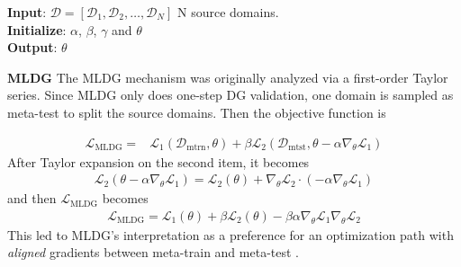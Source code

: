 \documentclass[runningheads]{llncs}
\newcommand{\nameS}{S-MLDG}
\newcommand{\keypoint}[1]{\vspace{0.1cm}\noindent\textbf{#1}\quad}
\begin{document}
\begin{algorithm}[t]
\SetAlgoLined
\textbf{Input}: $\mathcal{D} = [\mathcal{D}_1, \mathcal{D}_2, \dots, \mathcal{D}_N]$ N source domains.\\
\textbf{Initialize}: $\alpha$, $\beta$, $\gamma$ and $\theta$\\
\textbf{Output}: $\theta$
 \caption{Faster First-Order \nameS{}}
 \label{alg:reptile-dg}
\end{algorithm}
\keypoint{MLDG}
The MLDG mechanism was originally analyzed \cite{Li2018MLDG} via a first-order Taylor series. Since MLDG only does one-step DG validation, one domain is sampled as meta-test to split the source domains. Then the objective function is

\small
\begin{equation}
\begin{aligned}
\label{eq:mldg}
\mathcal{L}_{\text{MLDG}} = & \mathcal{L}_1(\mathcal{D}_{\text{mtrn}},\theta) +  \beta\mathcal{L}_2( \mathcal{D}_{\text{mtst}}, \theta-\alpha\nabla_\theta\mathcal{L}_1)
\end{aligned}
\end{equation}
\normalsize
After Taylor expansion on the second item, it  becomes
\small
\begin{equation}
\begin{aligned}
\label{eq:mldg-sec-item-taylor}
\mathcal{L}_2(\theta-\alpha\nabla_\theta\mathcal{L}_1) = \mathcal{L}_2(\theta) + \nabla_\theta\mathcal{L}_2 \cdot(-\alpha\nabla_\theta\mathcal{L}_1)
\end{aligned}
\end{equation}
\normalsize
and then $\mathcal{L}_{\text{MLDG}}$ becomes
\small
\begin{equation}
\begin{aligned}
\label{eq:mldg-taylor}
\mathcal{L}_{\text{MLDG}} = \mathcal{L}_1(\theta) +  \beta \mathcal{L}_2(\theta) - \beta \alpha \nabla_\theta\mathcal{L}_1 \nabla_\theta\mathcal{L}_2
\end{aligned}
\end{equation}
\normalsize
\noindent This led to MLDG's interpretation as a preference for an optimization path with \emph{aligned} gradients between meta-train and meta-test \cite{Li2018MLDG}.
\end{document}
